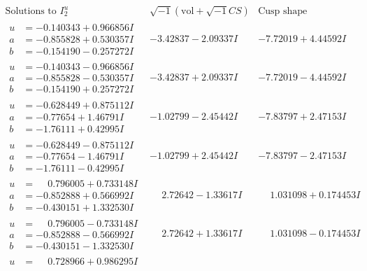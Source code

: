 \documentclass[1p]{elsarticle_modified}
\theoremstyle{definition}
\newcommand{\I}{\sqrt{-1}}
\begin{document}
$$\begin{array}{c|c|c}  
\text{Solutions to }I^u_{2}& \I (\text{vol} + \sqrt{-1}CS) & \text{Cusp shape}\\
 \hline 
\begin{aligned}
u &= -0.140343 + 0.966856 I \\
a &= -0.855828 + 0.530357 I \\
b &= -0.154190 - 0.257272 I\end{aligned}
 & -3.42837 - 2.09337 I & -7.72019 + 4.44592 I \\ \hline\begin{aligned}
u &= -0.140343 - 0.966856 I \\
a &= -0.855828 - 0.530357 I \\
b &= -0.154190 + 0.257272 I\end{aligned}
 & -3.42837 + 2.09337 I & -7.72019 - 4.44592 I \\ \hline\begin{aligned}
u &= -0.628449 + 0.875112 I \\
a &= -0.77654 + 1.46791 I \\
b &= -1.76111 + 0.42995 I\end{aligned}
 & -1.02799 - 2.45442 I & -7.83797 + 2.47153 I \\ \hline\begin{aligned}
u &= -0.628449 - 0.875112 I \\
a &= -0.77654 - 1.46791 I \\
b &= -1.76111 - 0.42995 I\end{aligned}
 & -1.02799 + 2.45442 I & -7.83797 - 2.47153 I \\ \hline\begin{aligned}
u &= \phantom{-}0.796005 + 0.733148 I \\
a &= -0.852888 + 0.566992 I \\
b &= -0.430151 + 1.332530 I\end{aligned}
 & \phantom{-}2.72642 - 1.33617 I & \phantom{-}1.031098 + 0.174453 I \\ \hline\begin{aligned}
u &= \phantom{-}0.796005 - 0.733148 I \\
a &= -0.852888 - 0.566992 I \\
b &= -0.430151 - 1.332530 I\end{aligned}
 & \phantom{-}2.72642 + 1.33617 I & \phantom{-}1.031098 - 0.174453 I \\ \hline\begin{aligned}
u &= \phantom{-}0.728966 + 0.986295 I \\

\end{aligned}
\end{array}$$
\end{document}
